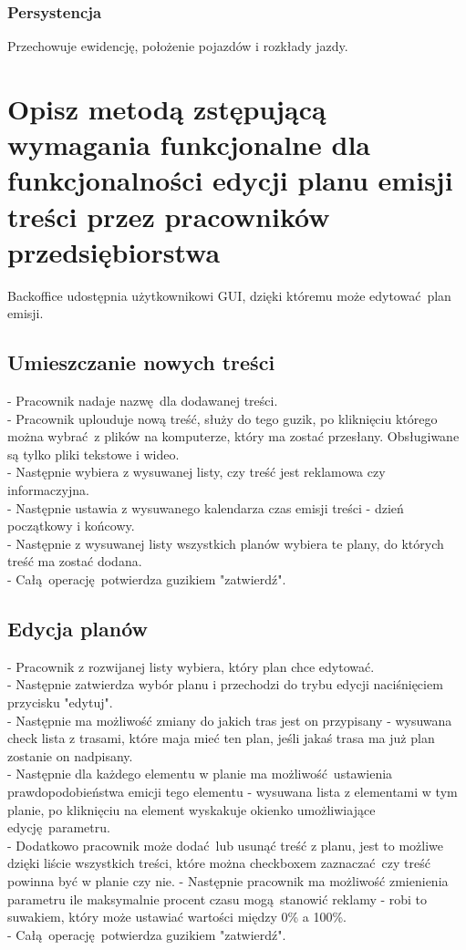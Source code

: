 \documentclass{article}
\begin{document}
      \subsubsection{Persystencja}
        Przechowuje ewidencję, położenie pojazdów i rozkłady jazdy.


  \newpage
  \section{Opisz metodą zstępującą wymagania funkcjonalne dla funkcjonalności edycji planu emisji treści przez pracowników przedsiębiorstwa}
    Backoffice udostępnia użytkownikowi GUI, dzięki któremu może edytować plan emisji.

    \subsection{Umieszczanie nowych treści}
      - Pracownik nadaje nazwę dla dodawanej treści. \\
      - Pracownik uplouduje nową treść, służy do tego guzik, po kliknięciu którego można wybrać z plików na komputerze, który ma zostać przesłany. 
        Obsługiwane są tylko pliki tekstowe i wideo. \\
      - Następnie wybiera z wysuwanej listy, czy treść jest reklamowa czy informaczyjna. \\
      - Następnie ustawia z wysuwanego kalendarza czas emisji treści - dzień początkowy i końcowy. \\
      - Następnie z wysuwanej listy wszystkich planów wybiera te plany, do których treść ma zostać dodana. \\
      - Całą operację potwierdza guzikiem "zatwierdź".

    \subsection{Edycja planów}
      - Pracownik z rozwijanej listy wybiera, który plan chce edytować. \\
      - Następnie zatwierdza wybór planu i przechodzi do trybu edycji naciśnięciem przycisku "edytuj". \\
      - Następnie ma możliwość zmiany do jakich tras jest on przypisany - wysuwana check lista z trasami, które maja mieć ten plan, jeśli jakaś trasa ma już plan zostanie on nadpisany. \\
      - Następnie dla każdego elementu w planie ma możliwość ustawienia prawdopodobieństwa emicji tego elementu - wysuwana lista z elementami w tym planie, po kliknięciu na element wyskakuje okienko umożliwiające edycję parametru. \\
      - Dodatkowo pracownik może dodać lub usunąć treść z planu, jest to możliwe dzięki liście wszystkich treści, które można checkboxem zaznaczać czy treść powinna być w planie czy nie.
      - Następnie pracownik ma możliwość zmienienia parametru ile maksymalnie procent czasu mogą stanowić reklamy - robi to suwakiem, który może ustawiać wartości między 0\% a 100\%. \\
      - Całą operację potwierdza guzikiem "zatwierdź".
\end{document}

